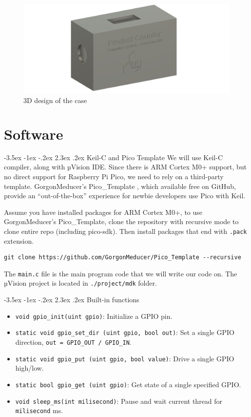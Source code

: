 \documentclass[a4paper,twoside]{report}
\makeatletter
\renewcommand\section{\@startsection {section}{1}{-1em}%
  {-3.5ex \@plus -1ex \@minus -.2ex}%
  {2.3ex \@plus.2ex}%
  {\normalfont\Large\bfseries}}
\makeatother
\begin{document}
\begin{figure}[H]
\centering
\includegraphics[scale=0.1]{images/device_3d.png}
\caption{3D design of the case}
\end{figure}
\chapter{Software}

\section{Keil-C and Pico Template}
We will use Keil-C compiler, along with µVision IDE. Since there is ARM Cortex M0+ support, but no direct support for Raspberry Pi Pico, we need to rely on a third-party template. GorgonMeducer's Pico\_Template \cite{pico_mdk}, which available free on GitHub, provide an ``out-of-the-box'' experience for newbie developers use Pico with Keil.

Assume you have installed packages for ARM Cortex M0+, to use GorgonMeducer's Pico\_Template, clone the repository with recursive mode to clone entire repo (including pico-sdk). Then install packages that end with \texttt{.pack} extension. 
\begin{verbatim}
git clone https://github.com/GorgonMeducer/Pico_Template --recursive
\end{verbatim}

The \texttt{main.c} file is the main program code that we will write our code on.
The µVision project is located in \texttt{./project/mdk} folder.

\section{Built-in functions}
\begin{itemize}
\item \texttt{void gpio_init(uint gpio)}: Initialize a GPIO pin.
\item \texttt{static void gpio_set_dir (uint gpio, bool out)}: Set a single GPIO direction, \texttt{out = GPIO\_OUT / GPIO\_IN}.
\item \texttt{static void gpio_put (uint gpio, bool value)}: Drive a single GPIO high/low.
\item \texttt{static bool gpio_get (uint gpio)}: Get state of a single specified GPIO.
\item \texttt{void sleep_ms(int milisecond)}: Pause and wait current thread for \texttt{milisecond} ms.
\end{itemize}
\end{document}
